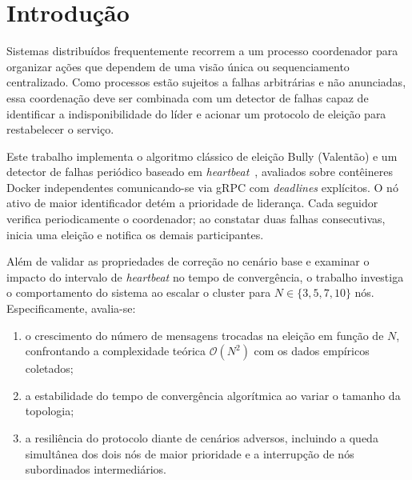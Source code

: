 \section{Introdução}
\label{sec:introducao}

Sistemas distribuídos frequentemente recorrem a um processo coordenador para
organizar ações que dependem de uma visão única ou sequenciamento centralizado.
Como processos estão sujeitos a falhas arbitrárias e não anunciadas, essa
coordenação deve ser combinada com um detector de falhas capaz de identificar a
indisponibilidade do líder e acionar um protocolo de eleição para restabelecer
o serviço.

Este trabalho implementa o algoritmo clássico de eleição Bully (Valentão) e um detector
de falhas periódico baseado em \textit{heartbeat}~\cite{tanenbaum2023}, avaliados sobre contêineres
Docker independentes comunicando-se via gRPC com \textit{deadlines} explícitos.
O nó ativo de maior identificador detém a prioridade de liderança. Cada seguidor
verifica periodicamente o coordenador; ao constatar duas falhas consecutivas,
inicia uma eleição e notifica os demais participantes.

Além de validar as propriedades de correção no cenário base e examinar o impacto
do intervalo de \textit{heartbeat} no tempo de convergência, o trabalho investiga
o comportamento do sistema ao escalar o cluster para $N \in \{3, 5, 7, 10\}$ nós.
Especificamente, avalia-se:
\begin{enumerate}
    \item o crescimento do número de mensagens trocadas na eleição em função de
    $N$, confrontando a complexidade teórica $\mathcal{O}(N^2)$ com os dados
    empíricos coletados;
    \item a estabilidade do tempo de convergência algorítmica ao variar o tamanho
    da topologia;
    \item a resiliência do protocolo diante de cenários adversos, incluindo a
    queda simultânea dos dois nós de maior prioridade e a interrupção de nós
    subordinados intermediários.
\end{enumerate}
